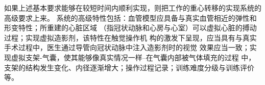 如果上述基本要求能够在较短时间内顺利实现，则把工作的重心转移的实现系统的高级要求上来。
系统的高级特性包括：血管模型应具备与真实血管相近的弹性和形变特性；所重建的心脏区域
（指冠状动脉和心房与心室）可以虚拟心脏的搏动过程；实现虚拟造影剂，该特性在触觉操作机
构的激发下呈现，应当具有与真实手术过程中，医生通过导管向冠状动脉中注入造影剂时的视觉
效果应当一致；实现虚拟支架-气囊，使其能够像真实情况一样--在气囊内部被气体填充的过程
中，支架的结构发生变化、内径逐渐增大；操作过程记录；训练难度分级与训练评价等。